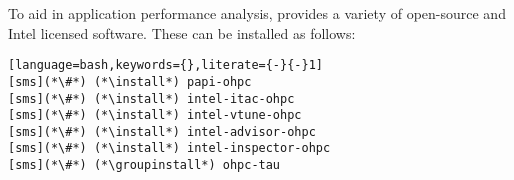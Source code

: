 To aid in application performance analysis, \OHPC{} provides a variety of
open-source and Intel licensed software. These can be installed as follows:

\begin{lstlisting}[language=bash,keywords={},literate={-}{-}1]
[sms](*\#*) (*\install*) papi-ohpc
[sms](*\#*) (*\install*) intel-itac-ohpc
[sms](*\#*) (*\install*) intel-vtune-ohpc
[sms](*\#*) (*\install*) intel-advisor-ohpc
[sms](*\#*) (*\install*) intel-inspector-ohpc
[sms](*\#*) (*\groupinstall*) ohpc-tau
\end{lstlisting}
